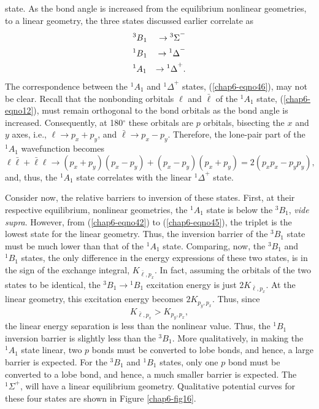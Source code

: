 state. As the bond
angle is increased from the equilibrium nonlinear geometries, to a linear
geometry, the three states discussed earlier correlate as
\begin{eqnarray}
&{^3B}_1 & \rightarrow {^3\Sigma}^-\cr
&{^1B}_1 & \rightarrow {^1\Delta}^-\cr
&{^1A}_1 & \rightarrow {^1\Delta}^+.
\label{chap6-eqno46}
\end{eqnarray}
The correspondence between the ${^1A}_1$ and ${^1\Delta}^+$ states,
(\ref{chap6-eqno46}), may not be clear.  Recall that the nonbonding
orbitals $\ell$ and ${\bar{\ell}}$ of the ${^1A}_1$ state,
(\ref{chap6-eqno12}), must remain orthogonal to the bond orbitals as
the bond angle is increased.  Consequently, at 180$^{\circ}$ these
orbitals are $p$ orbitals, bisecting the $x$ and $y$ axes, i.e., $\ell
\rightarrow p_x + p_y$, and ${\bar{\ell}} \rightarrow p_x - p_y$.
Therefore, the lone-pair part of the ${^1A}_1$ wavefunction becomes
\begin{equation}
\ell {\bar{\ell}} + {\bar{\ell}} \ell \rightarrow \left( p_x + p_y 
\right) \left( p_x - p_y \right) + \left( p_x - p_y \right) \left( 
p_x + p_y \right) = 2 \left( p_x p_x - p_y p_y \right),
\end{equation}
and, thus, the ${^1A}_1$ state correlates with the linear ${^1\Delta}^+$ state.

Consider now, the relative barriers to inversion of these states.
First, at their respective equilibrium, nonlinear geometries, the
${^1A}_1$ state is below the ${^3B}_1$, {\it vide supra}.  However,
from (\ref{chap6-eqno42}) to (\ref{chap6-eqno45}), the triplet is the
lowest state for the linear geometry.  Thus, the inversion barrier of
the ${^3B}_1$ state must be much lower than that of the ${^1A}_1$
state. Comparing, now, the ${^3B}_1$ and ${^1B}_1$ states, the only
difference in the energy expressions of these two states, is in the
sign of the exchange integral, $K_{{\bar{\ell}},p_x}$.  In fact,
assuming the orbitals of the two states to be identical, the ${^3B}_1
\rightarrow {^1B}_1$ excitation energy is just
$2K_{{\bar{\ell}},p_x}$.  At the linear geometry, this excitation
energy becomes $2K_{p_y,p_x}$.  Thus, since
\begin{equation}
K_{{\bar{\ell}},p_x} > K_{p_y,p_x},
\end{equation}
the linear energy separation is less than the nonlinear value.
Thus, the ${^1B}_1$ inversion barrier is slightly less than the 
${^3B}_1$. 	More qualitatively,
in making the ${^1A}_1$ state linear, two $p$ bonds must be converted 
to lobe bonds,
and hence, a large barrier is expected. For the ${^3B}_1$ and ${^1B}_1$
states, only one
$p$ bond must be converted to a lobe bond, and hence, a much smaller barrier
is expected.  The ${^1\Sigma}^+$, will have a linear equilibrium
geometry.  Qualitative potential curves for these four states are shown in
Figure \ref{chap6-fig16}.

